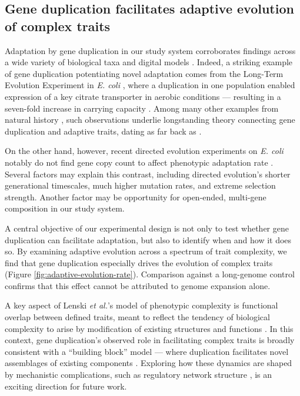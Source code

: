\subsection{Gene duplication facilitates adaptive evolution of complex traits}

Adaptation by gene duplication in our study system corroborates findings across a wide variety of biological taxa and digital models \citep{Koza:1995fr,Zhang:2003fw,Teichmann:2004cz}.
Indeed, a striking example of gene duplication potentiating novel adaptation comes from the Long-Term Evolution Experiment in \textit{E. coli} \citep{lenski1991longterm,Lenski2003phenotypic}, where a duplication in one population enabled expression of a key citrate transporter in aerobic conditions --- resulting in a seven-fold increase in carrying capacity \citep{blount_genomic_2012}.
Among many other examples from natural history \citep{zhang2002adaptive,gaines2009gene,perry2007diet,hittinger2007gene,benderoth2006positive,dulai1999evolution,Ogino2015}, such observations underlie longstanding theory connecting gene duplication and adaptive traits, dating as far back as \citet{ohno1970evolution}.

On the other hand, however, recent directed evolution experiments on \textit{E. coli} notably do not find gene copy count to affect phenotypic adaptation rate \citep{mihajlovic2025direct}.
Several factors may explain this contrast, including directed evolution's shorter generational timescales, much higher mutation rates, and extreme selection strength.
Another factor may be opportunity for open-ended, multi-gene composition in our study system.

A central objective of our experimental design is not only to test whether gene duplication can facilitate adaptation, but also to identify when and how it does so.
By examining adaptive evolution across a spectrum of trait complexity, we find that gene duplication especially drives the evolution of complex traits (Figure \ref{fig:adaptive-evolution-rate}).
Comparison against a long-genome control confirms that this effect cannot be attributed to genome expansion alone.

A key aspect of Lenski \textit{et al.}'s model of phenotypic complexity is functional overlap between defined traits, meant to reflect the tendency of biological complexity to arise by modification of existing structures and functions \citep{Lenski2003Evolutionary}.
In this context, gene duplication's observed role in facilitating complex traits is broadly consistent with a ``building block'' model --- where duplication facilitates novel assemblages of existing components \citep{Jacob1977}.
Exploring how these dynamics are shaped by mechanistic complications, such as regulatory network structure \citep{CussatBlanc2019,Lalejini2021}, is an exciting direction for future work.

